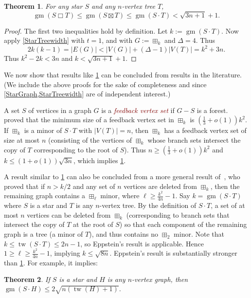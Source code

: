 \documentclass{patmorin}
\newcommand{\defn}[1]{\textcolor{Maroon}{\emph{#1}}}
\newcommand{\boxprod}{\mathbin{\Box}}
\renewcommand{\geq}{\geqslant}
\renewcommand{\leq}{\leqslant}
\DeclareMathOperator{\tw}{tw}
\DeclareMathOperator{\gm}{gm}
\theoremstyle{plain}
\newtheorem{thm}{Theorem}
\theoremstyle{definition}
\begin{document}
\begin{thm}
\label{StarTreeUpperBound}
For any star $S$ and any $n$-vertex tree $T$, 
$$\gm(S\boxprod T) \leq \gm(S \boxtimes T) \leq \gm(S\cdot T) <\sqrt{3n+1}+1.$$
\end{thm}

\begin{proof}
The first two inequalities hold by definition. Let $k:=\gm(S\cdot T)$. Now apply \cref{StarTreewidth} with $t=1$, and with $G:=\boxplus_k$ and $\Delta=4$. Thus
$$2k(k-1)  = |E(G)| < |V(G)| + (\Delta-1)|V(T)|
= k^2 + 3 n.
$$ 
Thus $k^2 -2k < 3n$ and $k<\sqrt{3n+1}+1$.
\end{proof}

We now show that results like \cref{StarTreeUpperBound} can be concluded from results in the literature. (We include the above proofs for the sake of completeness and since \cref{StarGraph,StarTreewidth} are of independent interest.) 

A set $S$ of vertices in a graph $G$ is a \defn{feedback vertex set} if $G-S$ is a forest. \citet{Luccio98} proved that the minimum size of a feedback vertex set in $\boxplus_k$ is $(\tfrac13+o(1))k^2$. If $\boxplus_k$ is a minor of $S\cdot T$ with $|V(T)|=n$, then $\boxplus_k$ has a feedback vertex set of size at most $n$ (consisting of the vertices of $\boxplus_k$ whose branch sets intersect the copy of $T$ corresponding to the root of $S$). Thus $n\geq (\tfrac13+o(1))k^2$ and $k\leq (1+o(1))\sqrt{3n}$, which implies \cref{StarTreeUpperBound}. 


A result similar to \cref{StarTreeUpperBound} can also be concluded from a more general result of~\citet[Theorem~3]{Eppstein14}, who proved that if $n>k/2$ and any set of $n$ vertices are deleted from $\boxplus_k$, then the remaining graph contains a $\boxplus_\ell$ minor, where $\ell\geq \frac{k^2}{4n}-1$. Say $k=\gm(S\cdot T)$ where $S$ is a star and $T$ is any $n$-vertex tree. By the definition of $S\cdot T$, a set of at most $n$ vertices can be deleted from $\boxplus_k$ (corresponding to branch sets that intersect the copy of $T$ at the root of $S$) so that each component of the remaining graph is a tree (a minor of $T$), and thus contains no $\boxplus_2$ minor. 
Note that $k \leq \tw(S\cdot T)\leq 2n-1$, so Eppstein's result is applicable. Hence  $1 \geq \ell\geq \frac{k^2}{4n}-1$, implying $k\leq\sqrt{8n}$. Eppstein's result is substantially stronger than \cref{StarTreeUpperBound}. For example, it implies: 

\begin{thm}
\label{StarGraphUpperBound}
If $S$ is a star and $H$ is any $n$-vertex graph, then $\gm(S\cdot H)\leq 2\sqrt{n( \tw(H) +1)}$.
\end{thm}
\end{document}
